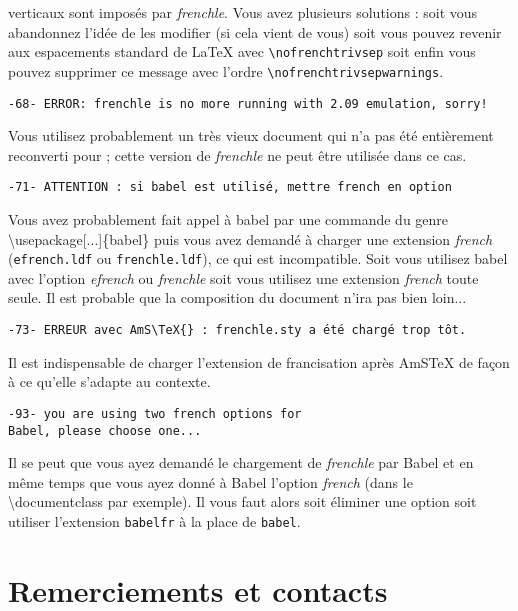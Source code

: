 \documentclass[a4paper,12pt,openright]{article}
\begin{document}
verticaux sont imposés par \textit{frenchle}. Vous avez plusieurs solutions : 
soit vous abandonnez l’idée de les modifier (si cela vient de
vous) soit vous pouvez revenir aux espacements standard de \LaTeX{} avec
\texttt{\backslash{}nofrenchtrivsep} soit enfin vous pouvez supprimer ce message avec
l’ordre \texttt{\backslash{}nofrenchtrivsepwarnings}.\\
\begin{verbatim}
-68- ERROR: frenchle is no more running with 2.09 emulation, sorry!
\end{verbatim}
Vous utilisez probablement un très vieux document qui n’a pas été entièrement
reconverti pour \LaTeXe ; cette version de \textit{frenchle} ne peut être utilisée
dans ce cas.\\
\begin{verbatim}
-71- ATTENTION : si babel est utilisé, mettre french en option
\end{verbatim}
Vous avez probablement fait appel à babel
 par une commande du genre
\backslash{}usepackage[...]\{babel\} puis vous avez demandé à charger une extension
\textsl{french} (\texttt{efrench.ldf} ou \texttt{frenchle.ldf}), ce qui est incompatible. Soit
vous utilisez babel avec l’option \textit{efrench} ou \textit{frenchle} soit vous utilisez
une extension \textsl{french} toute seule. Il est probable que la composition du
document n’ira pas bien loin...\\
\begin{verbatim}
-73- ERREUR avec AmS\TeX{} : frenchle.sty a été chargé trop tôt.
\end{verbatim}
Il est indispensable de charger l’extension de francisation après AmS\TeX{}
de façon à ce qu’elle s’adapte au contexte.\\
\begin{verbatim}
-93- you are using two french options for
Babel, please choose one...
\end{verbatim}
Il se peut que vous ayez demandé le chargement de \textit{frenchle} par Babel
et en même temps que vous ayez donné à Babel l’option \textsl{french} (dans le
\backslash{}documentclass par exemple). Il vous faut alors soit éliminer une option
soit utiliser l’extension \texttt{babelfr} 
à la place de \texttt{babel}.
\pagebreak
\section{Remerciements et contacts}
\end{document}
